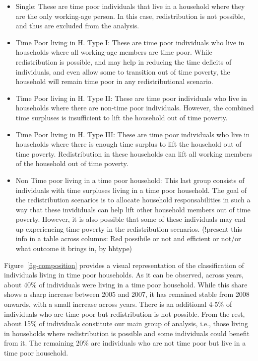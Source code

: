 \documentclass[
  11pt,
]{article}
\providecommand{\tightlist}{%
  \setlength{\itemsep}{0pt}\setlength{\parskip}{0pt}}\usepackage{longtable,booktabs,array}
\begin{document}
\begin{itemize}
\tightlist
\item
  Single: These are time poor individuals that live in a household where
  they are the only working-age person. In this case, redistribution is
  not possible, and thus are excluded from the analysis.
\item
  Time Poor living in H. Type I: These are time poor individuals who
  live in households where all working-age members are time poor. While
  redistribution is possible, and may help in reducing the time deficits
  of individuals, and even allow some to transition out of time poverty,
  the household will remain time poor in any redistributional scenario.
\item
  Time Poor living in H. Type II: These are time poor individuals who
  live in households where there are non-time poor individuals. However,
  the combined time surpluses is insufficient to lift the household out
  of time poverty.
\item
  Time Poor living in H. Type III: These are time poor individuals who
  live in households where there is enough time surplus to lift the
  household out of time poverty. Redistribution in these households can
  lift all working members of the household out of time poverty.
\item
  Non Time poor living in a time poor household: This last group
  consists of individuals with time surpluses living in a time poor
  household. The goal of the redistribution scenarios is to allocate
  household responsabilities in such a way that these invididuals can
  help lift other household members out of time poverty. However, it is
  also possible that some of these individuals may end up experiencing
  time poverty in the redistribution scenarios. (!present this info in a
  table across columns: Red possibile or not and efficient or not/or
  what outcome it brings in, by hhtype)
\end{itemize}

Figure~\ref{fig-composition} provides a visual representation of the
classification of individuals living in time poor households. As it can
be observed, across years, about 40\% of individuals were living in a
time poor household. While this share shows a sharp increase between
2005 and 2007, it has remained stable from 2008 onwards, with a small
increase across years. There is an additional 4-5\% of individuals who
are time poor but redistribution is not possible. From the rest, about
15\% of individuals constitute our main group of analysis, i.e., those
living in households where redistribution is possible and some
individuals could benefit from it. The remaining 20\% are individuals
who are not time poor but live in a time poor household.
\end{document}
